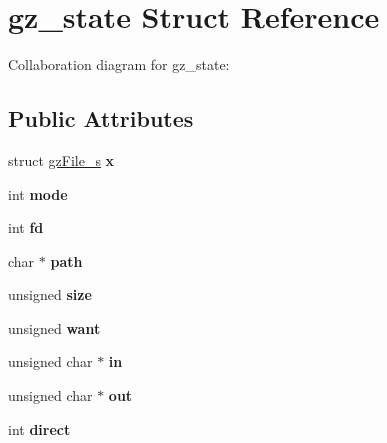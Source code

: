 \hypertarget{structgz__state}{\section{gz\+\_\+state Struct Reference}
\label{structgz__state}
}


Collaboration diagram for gz\+\_\+state\+:
\subsection*{Public Attributes}
\begin{DoxyCompactItemize}
\item 
\hypertarget{structgz__state_a92b9a7b77e0b6a494275d8bf0f0f3274}{struct \hyperlink{structgz_file__s}{gz\+File\+\_\+s} {\bfseries x}}\label{structgz__state_a92b9a7b77e0b6a494275d8bf0f0f3274}

\item 
\hypertarget{structgz__state_aaded3d8b2702b1bfabe3141e6f772b1a}{int {\bfseries mode}}\label{structgz__state_aaded3d8b2702b1bfabe3141e6f772b1a}

\item 
\hypertarget{structgz__state_a5963abca9e640ff2aa40b517f9cffc2c}{int {\bfseries fd}}\label{structgz__state_a5963abca9e640ff2aa40b517f9cffc2c}

\item 
\hypertarget{structgz__state_ae80c08b32718cb553d755652008da859}{char $\ast$ {\bfseries path}}\label{structgz__state_ae80c08b32718cb553d755652008da859}

\item 
\hypertarget{structgz__state_a36b86ed64aca8f022ec0f3411663fe24}{unsigned {\bfseries size}}\label{structgz__state_a36b86ed64aca8f022ec0f3411663fe24}

\item 
\hypertarget{structgz__state_abee992fb115f9f118377b9f46d14b2a5}{unsigned {\bfseries want}}\label{structgz__state_abee992fb115f9f118377b9f46d14b2a5}

\item 
\hypertarget{structgz__state_ae907e56872be78a140f2c07e9796898d}{unsigned char $\ast$ {\bfseries in}}\label{structgz__state_ae907e56872be78a140f2c07e9796898d}

\item 
\hypertarget{structgz__state_ae08963e6f54d0c1a8ba311f14f3cf941}{unsigned char $\ast$ {\bfseries out}}\label{structgz__state_ae08963e6f54d0c1a8ba311f14f3cf941}

\item 
\hypertarget{structgz__state_a114c6a0de43039853ead48a092792a7d}{int {\bfseries direct}}\label{structgz__state_a114c6a0de43039853ead48a092792a7d}


\end{DoxyCompactItemize}
